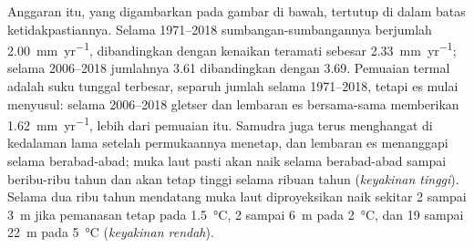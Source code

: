 Anggaran itu, yang digambarkan pada gambar di bawah, tertutup di dalam batas ketidakpastiannya. Selama 1971--2018 sumbangan-sumbangannya berjumlah
\qty{2.00}{mm.yr^{-1}}, dibandingkan dengan kenaikan teramati sebesar \qty{2.33}{mm.yr^{-1}}; selama 2006--2018 jumlahnya
3.61 dibandingkan dengan 3.69. Pemuaian termal adalah suku tunggal terbesar, separuh jumlah selama 1971--2018, tetapi es
mulai menyusul: selama 2006--2018 gletser dan lembaran es bersama-sama memberikan \qty{1.62}{mm.yr^{-1}}, lebih dari
pemuaian itu. Samudra juga terus menghangat di kedalaman lama setelah permukaannya menetap, dan lembaran
es menanggapi selama berabad-abad; muka laut pasti akan naik selama berabad-abad sampai beribu-ribu tahun dan akan
tetap tinggi selama ribuan tahun (\emph{keyakinan tinggi}). Selama dua ribu tahun mendatang muka laut
diproyeksikan naik sekitar 2 sampai \qty{3}{m} jika pemanasan tetap pada \qty{1.5}{\celsius}, 2 sampai
\qty{6}{m} pada \qty{2}{\celsius}, dan 19 sampai \qty{22}{m} pada \qty{5}{\celsius} (\emph{keyakinan rendah}).

